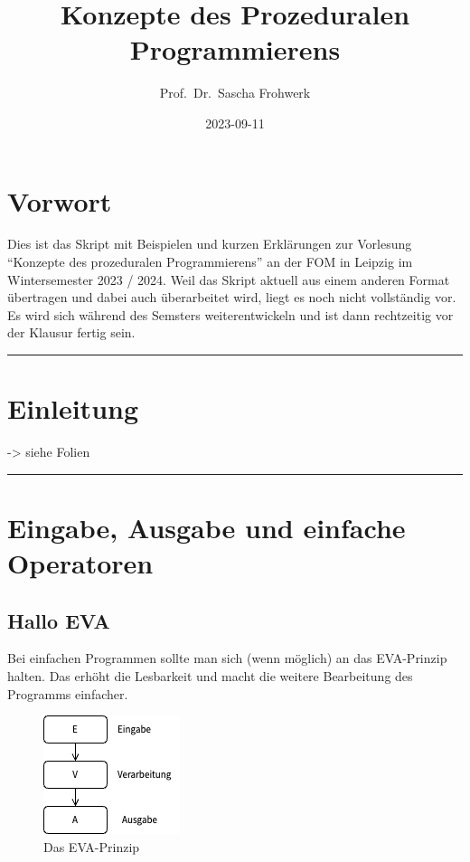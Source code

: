 \documentclass[
]{book}
\title{Konzepte des Prozeduralen Programmierens}
\author{Prof.~Dr.~Sascha Frohwerk}
\date{2023-09-11}
\begin{document}
\maketitle

{
\setcounter{tocdepth}{1}
\tableofcontents
}
\hypertarget{vorwort}{%
\chapter*{Vorwort}\label{vorwort}}

Dies ist das Skript mit Beispielen und kurzen Erklärungen zur Vorlesung ``Konzepte des prozeduralen Programmierens'' an der FOM in Leipzig im Wintersemester 2023 / 2024. Weil das Skript aktuell aus einem anderen Format übertragen und dabei auch überarbeitet wird, liegt es noch nicht vollständig vor. Es wird sich während des Semsters weiterentwickeln und ist dann rechtzeitig vor der Klausur fertig sein.

\begin{center}\rule{0.5\linewidth}{0.5pt}\end{center}

\hypertarget{einleitung}{%
\chapter{Einleitung}\label{einleitung}}

-\textgreater{} siehe Folien

\begin{center}\rule{0.5\linewidth}{0.5pt}\end{center}

\hypertarget{Eingabe-Ausgabe-Operatoren}{%
\chapter{Eingabe, Ausgabe und einfache Operatoren}\label{Eingabe-Ausgabe-Operatoren}}

\hypertarget{hallo-eva}{%
\section{Hallo EVA}\label{hallo-eva}}

Bei einfachen Programmen sollte man sich (wenn möglich) an das EVA-Prinzip halten. Das erhöht die Lesbarkeit und macht die weitere Bearbeitung des Programms einfacher.

\begin{figure}
\centering
\includegraphics{assets/eva.png}
\caption{Das EVA-Prinzip}
\end{figure}
\end{document}
